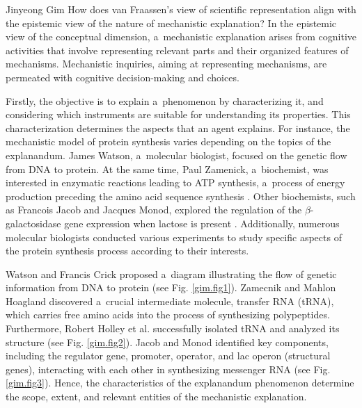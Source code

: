 \begin{artengenv}{Jinyeong Gim}
How does van Fraassen's view of scientific representation align with the epistemic view of the nature of mechanistic explanation? In the epistemic view of the conceptual dimension, a~mechanistic explanation arises from cognitive activities that involve representing relevant parts and their organized features of mechanisms. Mechanistic inquiries, aiming at representing mechanisms, are permeated with cognitive decision-making and choices.

Firstly, the objective is to explain a~phenomenon by characterizing it, and considering which instruments are suitable for understanding its properties. This characterization determines the aspects that an agent explains. For instance, the mechanistic model of protein synthesis varies depending on the topics of the explanandum. James Watson, a~molecular biologist, focused on the genetic flow from DNA to protein. At the same time, Paul Zamenick, a~biochemist, was interested in enzymatic reactions leading to ATP synthesis, a~process of energy production preceding the amino acid sequence synthesis
\parencite[see][part 2]{judson_eighth_2013}. %
 Other biochemists, such as Francois Jacob and Jacques Monod, explored the regulation of the $\beta $-galactosidase gene expression when lactose is present 
\parencite[see][]{pardee_genetic_1959}. %
 Additionally, numerous molecular biologists conducted various experiments to study specific aspects of the protein synthesis process according to their interests.

Watson and Francis Crick proposed a~diagram illustrating the flow of genetic information from DNA to protein (see Fig. \ref{gim.fig1}). Zamecnik and Mahlon Hoagland discovered a~crucial intermediate molecule, transfer RNA (tRNA), which carries free amino acids into the process of synthesizing polypeptides. Furthermore, Robert Holley et al.
\parencite*[][]{hempel_aspects_1965} %
 successfully isolated tRNA and analyzed its structure (see Fig. \ref{gim.fig2}). Jacob and Monod identified key components, including the regulator gene, promoter, operator, and lac operon (structural genes), interacting with each other in synthesizing messenger RNA (see Fig. \ref{gim.fig3}). Hence, the characteristics of the explanandum phenomenon determine the scope, extent, and relevant entities of the mechanistic explanation.


\end{artengenv}
